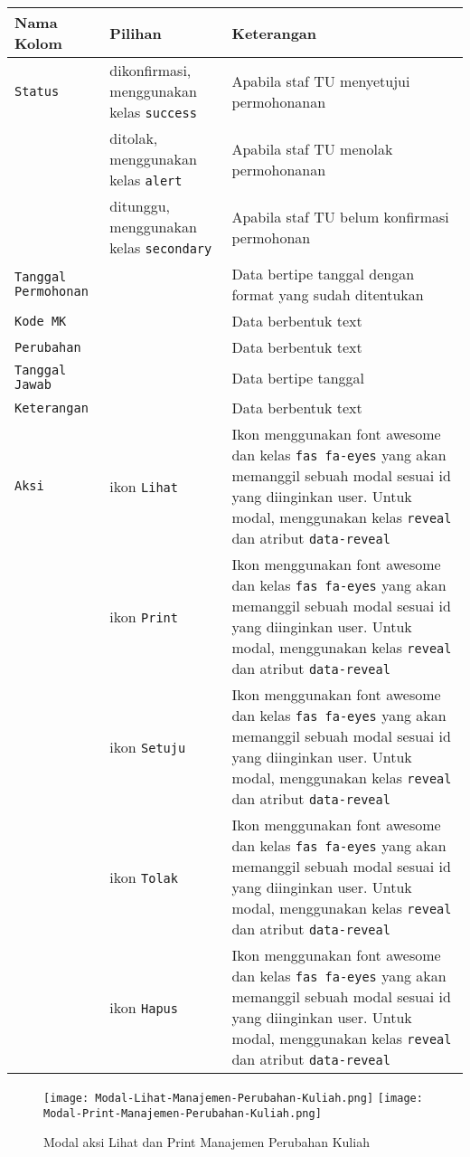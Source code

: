 \begin{tabular}{|p{4cm}|p{2cm}|p{10cm}|}
	\hline
	Nama Kolom & Pilihan & Keterangan\\
	\hline
	\texttt{Status} & dikonfirmasi, menggunakan kelas \verb|success| & Apabila staf TU menyetujui permohonanan\\
	\hline
	&  ditolak, menggunakan kelas \verb|alert|  & Apabila staf TU menolak permohonanan\\
	\hline
	& ditunggu, menggunakan kelas \verb|secondary| &  Apabila staf TU belum konfirmasi permohonan \\
	\hline
	\texttt{Tanggal Permohonan}    & & Data bertipe tanggal dengan format yang sudah ditentukan\\
	\hline
	\texttt{Kode MK} &  & Data berbentuk text \\
	\hline
	\texttt{Perubahan} &  & Data berbentuk text \\
	\hline
	\texttt{Tanggal Jawab} &  & Data bertipe tanggal \\
	\hline
	\texttt{Keterangan} &  & Data berbentuk text \\
	\hline
	\texttt{Aksi} & ikon \texttt{Lihat} & Ikon menggunakan font awesome dan kelas \verb|fas fa-eyes| yang akan memanggil sebuah modal sesuai id yang diinginkan user. Untuk modal, menggunakan kelas \texttt{reveal} dan atribut \texttt{data-reveal}\\
	\hline
	& ikon \texttt{Print} & Ikon menggunakan font awesome dan kelas \verb|fas fa-eyes| yang akan memanggil sebuah modal sesuai id yang diinginkan user. Untuk modal, menggunakan kelas \texttt{reveal} dan atribut \texttt{data-reveal}\\
	\hline
	& ikon \texttt{Setuju} & Ikon menggunakan font awesome dan kelas \verb|fas fa-eyes| yang akan memanggil sebuah modal sesuai id yang diinginkan user. Untuk modal, menggunakan kelas \texttt{reveal} dan atribut \texttt{data-reveal}\\
	\hline
	& ikon \texttt{Tolak} & Ikon menggunakan font awesome dan kelas \verb|fas fa-eyes| yang akan memanggil sebuah modal sesuai id yang diinginkan user. Untuk modal, menggunakan kelas \texttt{reveal} dan atribut \texttt{data-reveal}\\
	\hline
	& ikon \texttt{Hapus} & Ikon menggunakan font awesome dan kelas \verb|fas fa-eyes| yang akan memanggil sebuah modal sesuai id yang diinginkan user. Untuk modal, menggunakan kelas \texttt{reveal} dan atribut \texttt{data-reveal}\\	
	\hline
\end{tabular}
\begin{figure} [H]
	\centering  
	\texttt{[image: Modal-Lihat-Manajemen-Perubahan-Kuliah.png]}  
	\texttt{[image: Modal-Print-Manajemen-Perubahan-Kuliah.png]} 
	\caption{Modal aksi Lihat dan Print Manajemen Perubahan Kuliah} 
\end{figure}



